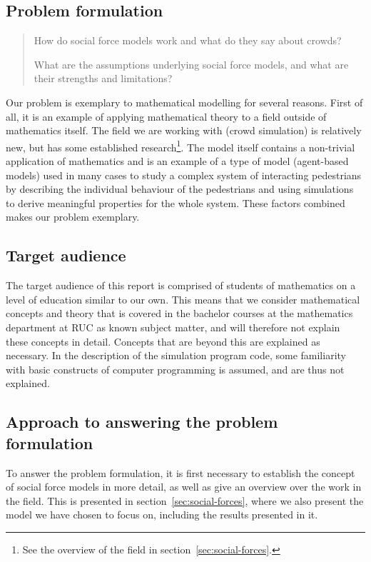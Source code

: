 \subsection{Problem formulation}
\begin{quote}
    How do social force models work and what do they say about crowds?

    What are the assumptions underlying social force models, and what are
    their strengths and limitations?
\end{quote}

Our problem is exemplary to mathematical modelling for several reasons. First
of all, it is an example of applying mathematical theory to a field outside of
mathematics itself. The field we are working with (crowd simulation) is
relatively new, but has some established research\footnote{See the overview of
the field in section~\ref{sec:social-forces}.}. The model itself contains a
non-trivial application of mathematics and is an example of a type of model
(agent-based models) used in many cases to study a complex system of
interacting pedestrians by describing the individual behaviour of the pedestrians and
using simulations to derive meaningful properties for the whole system. These
factors combined makes our problem exemplary.

\subsection{Target audience}
The target audience of this report is comprised of students of mathematics on
a level of education similar to our own. This means that we consider
mathematical concepts and theory that is covered in the bachelor courses at
the mathematics department at RUC as known subject matter, and will therefore
not explain these concepts in detail. Concepts that are beyond this are
explained as necessary. In the description of the simulation program code,
some familiarity with basic constructs of computer programming is assumed, and
are thus not explained.

\subsection{Approach to answering the problem formulation}

To answer the problem formulation, it is first necessary to establish the
concept of social force models in more detail, as well as give an overview
over the work in the field. This is presented in
section~\ref{sec:social-forces}, where we also present the model we have chosen
to focus on, including the results presented in it.

